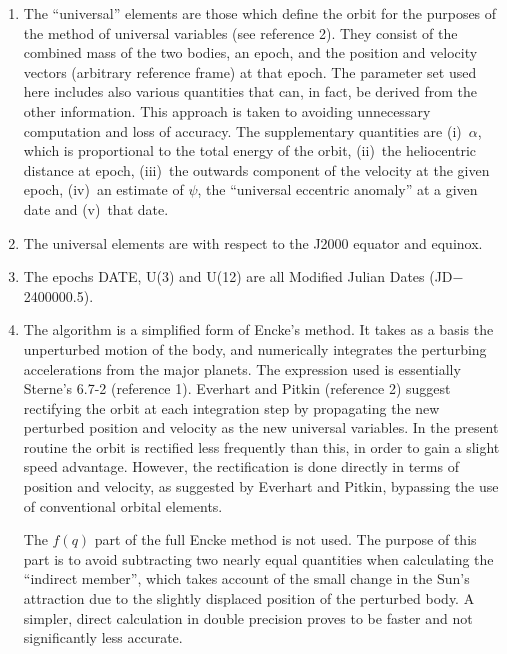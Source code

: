\documentclass[11pt,twoside]{article}
\begin{document}
{
 \begin{enumerate}
  \setlength{\parskip}{\medskipamount}
  \item The ``universal'' elements are those which define the orbit for the
        purposes of the method of universal variables (see reference 2).
        They consist of the combined mass of the two bodies, an epoch,
        and the position and velocity vectors (arbitrary reference frame)
        at that epoch.  The parameter set used here includes also various
        quantities that can, in fact, be derived from the other
        information.  This approach is taken to avoiding unnecessary
        computation and loss of accuracy.  The supplementary quantities
        are (i)~$\alpha$, which is proportional to the total energy of the
        orbit, (ii)~the heliocentric distance at epoch,
        (iii)~the outwards component of the velocity at the given epoch,
        (iv)~an estimate of $\psi$, the ``universal eccentric anomaly'' at a
        given date and (v)~that date.

  \item The universal elements are with respect to the J2000 equator and
        equinox.

  \item The epochs DATE, U(3) and U(12) are all Modified Julian Dates
        (JD$-$2400000.5).

  \item The algorithm is a simplified form of Encke's method.  It takes as
        a basis the unperturbed motion of the body, and numerically
        integrates the perturbing accelerations from the major planets.
        The expression used is essentially Sterne's 6.7-2 (reference 1).
        Everhart and Pitkin (reference 2) suggest rectifying the orbit at
        each integration step by propagating the new perturbed position
        and velocity as the new universal variables.  In the present
        routine the orbit is rectified less frequently than this, in order
        to gain a slight speed advantage.  However, the rectification is
        done directly in terms of position and velocity, as suggested by
        Everhart and Pitkin, bypassing the use of conventional orbital
        elements.

        The $f(q)$ part of the full Encke method is not used.  The purpose
        of this part is to avoid subtracting two nearly equal quantities
        when calculating the ``indirect member'', which takes account of the
        small change in the Sun's attraction due to the slightly displaced
        position of the perturbed body.  A simpler, direct calculation in
        double precision proves to be faster and not significantly less
        accurate.


\end{enumerate}}
\end{document}
